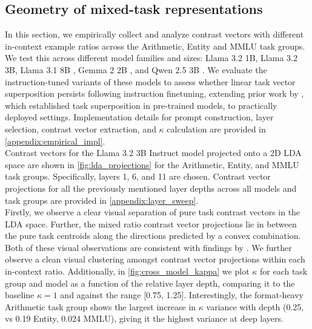\documentclass[11pt]{article}
\begin{document}
\subsection{Geometry of mixed-task representations}
In this section, we empirically collect and analyze contrast vectors with different in-context example ratios across the Arithmetic, Entity and MMLU task groups. We test this across different model families and sizes: Llama 3.2 1B, Llama 3.2 3B, Llama 3.1 8B \citep{grattafiori2024llama3}, Gemma 2 2B \citep{gemmateam2024gemma2}, and Qwen 2.5 3B \citep{yang2024qwen25}. We evaluate the instruction-tuned variants of these models to assess whether linear task vector superposition persists following instruction finetuning, extending prior work by \citet{xiong2024everything}, which established task superposition in pre-trained models, to practically deployed settings. Implementation details for prompt construction, layer selection, contrast vector extraction, and \(\kappa\) calculation are provided in \autoref{appendix:empirical_impl}. \\[1em]
Contrast vectors for the Llama 3.2 3B Instruct model projected onto a 2D LDA space are shown in \autoref{fig:lda_projections} for the Arithmetic, Entity, and MMLU task groups. Specifically, layers 1, 6, and 11 are chosen. Contrast vector projections for all the previously mentioned layer depths across all models and task groups are provided in \autoref{appendix:layer_sweep}. \\[1em]
Firstly, we observe a clear visual separation of pure task contrast vectors in the LDA space. Further, the mixed ratio contrast vector projections lie in between the pure task centroids along the directions predicted by a convex combination. Both of these visual observations are consistent with findings by \citet{xiong2024everything}. We further observe a clean visual clustering amongst contrast vector projections within each in-context ratio.
Additionally, in \autoref{fig:cross_model_kappa} we plot \(\kappa\) for each task group and model as a function of the relative layer depth, comparing it to the baseline \(\kappa = 1\) and against the range [0.75, 1.25]. Interestingly, the format-heavy Arithmetic task group shows the largest increase in \(\kappa\) variance with depth (0.25, vs 0.19 Entity, 0.024 MMLU), giving it the highest variance at deep layers. \\[1em]
\end{document}
